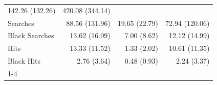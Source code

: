 \begin{table}[!h]
\begin{tabular}{llll}
  \multicolumn{1}{r}{142.26 (132.26)} &
  \multicolumn{1}{r}{420.08 (344.14)} \\
\multicolumn{1}{l}{\hspace{1em}Searches} &
  \multicolumn{1}{r}{88.56 (131.96)} &
  \multicolumn{1}{r}{19.65 (22.79)} &
  \multicolumn{1}{r}{72.94 (120.06)} \\
\multicolumn{1}{l}{\hspace{1em}Black Searches} &
  \multicolumn{1}{r}{13.62 (16.09)} &
  \multicolumn{1}{r}{7.00 (8.62)} &
  \multicolumn{1}{r}{12.12 (14.99)} \\
\multicolumn{1}{l}{\hspace{1em}Hits} &
  \multicolumn{1}{r}{13.33 (11.52)} &
  \multicolumn{1}{r}{1.33 (2.02)} &
  \multicolumn{1}{r}{10.61 (11.35)} \\
\multicolumn{1}{l}{\hspace{1em}Black Hits} &
  \multicolumn{1}{r}{2.76 (3.64)} &
  \multicolumn{1}{r}{0.48 (0.93)} &
  \multicolumn{1}{r}{2.24 (3.37)} \\
\cline{1-4}
\end{tabular}
\end{table}
